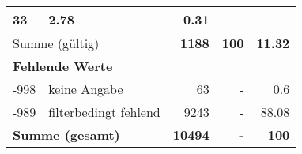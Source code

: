 \begin{longtable}{lXrrr}
       \num{33} &
       \num[round-mode=places,round-precision=2]{2.78} &
         \num[round-mode=places,round-precision=2]{0.31} \\
     \midrule
     \multicolumn{2}{l}{Summe (gültig)} &
       \textbf{\num{1188}} &
     \textbf{\num{100}} &
       \textbf{\num[round-mode=places,round-precision=2]{11.32}} \\
     \multicolumn{5}{l}{\textbf{Fehlende Werte}}\\
       -998 &
       keine Angabe &
         \num{63} &
        - &
         \num[round-mode=places,round-precision=2]{0.6} \\
       -989 &
       filterbedingt fehlend &
         \num{9243} &
        - &
         \num[round-mode=places,round-precision=2]{88.08} \\
     \midrule
     \multicolumn{2}{l}{\textbf{Summe (gesamt)}} &
          \textbf{\num{10494}} &
        \textbf{-} &
        \textbf{\num{100}} \\
     \bottomrule
     \end{longtable}
     
